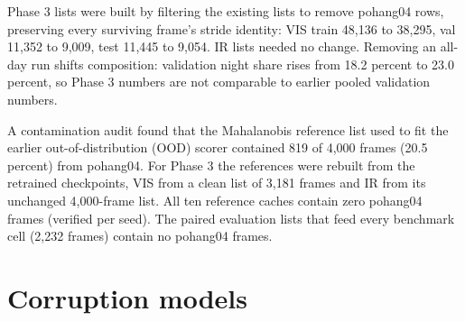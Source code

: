 \documentclass[journal,onecolumn]{IEEEtran}
\begin{document}
Phase 3 lists were built by filtering the existing lists to remove pohang04 rows, preserving every surviving frame's stride identity: VIS train 48,136 to 38,295, val 11,352 to 9,009, test 11,445 to 9,054. IR lists needed no change. Removing an all-day run shifts composition: validation night share rises from 18.2 percent to 23.0 percent, so Phase 3 numbers are not comparable to earlier pooled validation numbers.

A contamination audit found that the Mahalanobis reference list used to fit the earlier out-of-distribution (OOD) scorer contained 819 of 4,000 frames (20.5 percent) from pohang04. For Phase 3 the references were rebuilt from the retrained checkpoints, VIS from a clean list of 3,181 frames and IR from its unchanged 4,000-frame list. All ten reference caches contain zero pohang04 frames (verified per seed). The paired evaluation lists that feed every benchmark cell (2,232 frames) contain no pohang04 frames.

\FloatBarrier
\section{Corruption models}\label{app:B}
\end{document}
